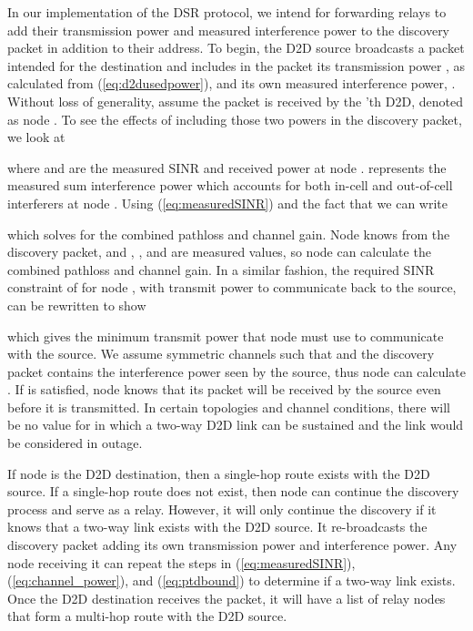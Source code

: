 \documentclass[10pt, final, journal, letterpaper,oneside, twocolumn]{IEEEtran}
\begin{document}
In our implementation of the DSR protocol, we intend for forwarding relays to add their transmission power and measured interference power to the discovery packet in addition to their address.  To begin, the D2D source broadcasts a packet intended for the destination and includes in the packet its transmission power , as calculated from (\ref{eq:d2dusedpower}), and its own measured interference power, .  Without loss of generality, assume the packet is received by the 'th D2D, denoted as node .  To see the effects of including those two powers in the discovery packet, we look at

where  and  are the measured SINR and received power at node .   represents the measured sum interference power which accounts for both in-cell and out-of-cell interferers at node .  Using (\ref{eq:measuredSINR}) and the fact that  we can write

which solves for the combined pathloss and channel gain.  Node  knows  from the discovery packet, and , , and  are measured values, so node  can calculate the combined pathloss and channel gain.  In a similar fashion, the required SINR constraint of  for node , with transmit power  to communicate back to the source, can be rewritten to show

which gives the minimum transmit power that node  must use to communicate with the source.  We assume symmetric channels such that  and the discovery packet contains the interference power seen by the source, thus node  can calculate .  If  is satisfied, node  knows that its packet will be received by the source even before it is transmitted.  In certain topologies and channel conditions, there will be no value for  in which a two-way D2D link can be sustained and the link would be considered in outage.  

If node  is the D2D destination, then a single-hop route exists with the D2D source.  If a single-hop route does not exist, then node  can continue the discovery process and serve as a relay.  However, it will only continue the discovery if it knows that a two-way link exists with the D2D source.  It re-broadcasts the discovery packet adding its own transmission power and interference power.  Any node receiving it can repeat the steps in (\ref{eq:measuredSINR}), (\ref{eq:channel_power}), and (\ref{eq:ptdbound}) to determine if a two-way link exists.  Once the D2D destination receives the packet, it will have a list of relay nodes that form a multi-hop route with the D2D source.  
\end{document}
